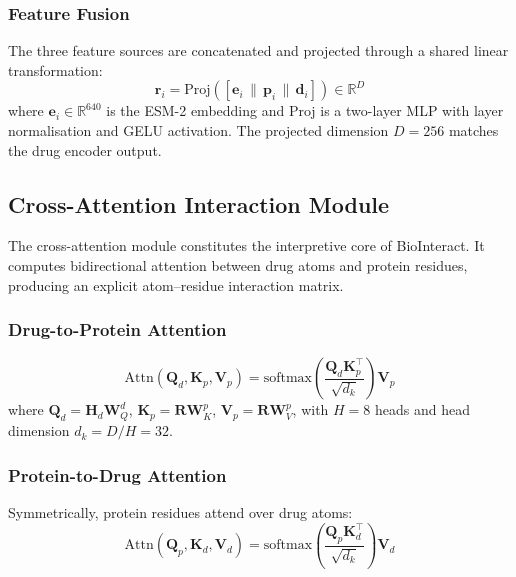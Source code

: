 \documentclass[fleqn,10pt]{wlscirep}
\begin{document}
\subsubsection{Feature Fusion}

The three feature sources are concatenated and projected through a shared linear
transformation:
\begin{equation}
\mathbf{r}_i = \mathrm{Proj}\!\left(
  [\mathbf{e}_i \,\|\, \mathbf{p}_i \,\|\, \mathbf{d}_i]
\right) \in \mathbb{R}^{D}
\end{equation}
where $\mathbf{e}_i \in \mathbb{R}^{640}$ is the ESM-2 embedding and Proj is a
two-layer MLP with layer normalisation and GELU activation.  The projected
dimension $D=256$ matches the drug encoder output.

\subsection{Cross-Attention Interaction Module}

The cross-attention module constitutes the interpretive core of BioInteract.
It computes bidirectional attention between drug atoms and protein residues,
producing an explicit atom--residue interaction matrix.

\subsubsection{Drug-to-Protein Attention}

\begin{equation}
\mathrm{Attn}(\mathbf{Q}_d,\mathbf{K}_p,\mathbf{V}_p) =
  \mathrm{softmax}\!\left(\frac{\mathbf{Q}_d\mathbf{K}_p^\top}{\sqrt{d_k}}\right)
  \mathbf{V}_p
\end{equation}
where $\mathbf{Q}_d = \mathbf{H}_d\mathbf{W}_Q^d$,
$\mathbf{K}_p = \mathbf{R}\mathbf{W}_K^p$,
$\mathbf{V}_p = \mathbf{R}\mathbf{W}_V^p$, with $H=8$ heads and head
dimension $d_k = D/H = 32$.

\subsubsection{Protein-to-Drug Attention}

Symmetrically, protein residues attend over drug atoms:
\begin{equation}
\mathrm{Attn}(\mathbf{Q}_p,\mathbf{K}_d,\mathbf{V}_d) =
  \mathrm{softmax}\!\left(\frac{\mathbf{Q}_p\mathbf{K}_d^\top}{\sqrt{d_k}}\right)
  \mathbf{V}_d
\end{equation}
\end{document}
